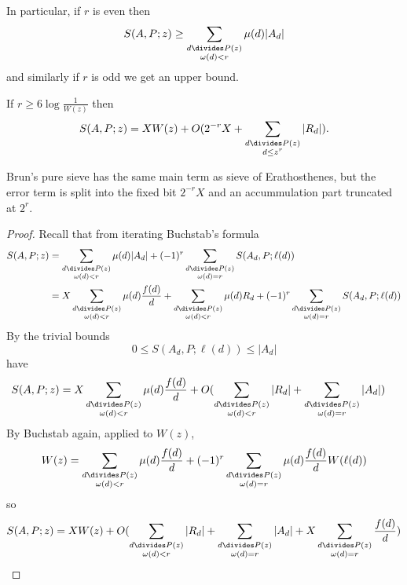 \documentclass[a4paper]{article}
\theoremstyle{definition}
\begin{document}
In particular, if \(r\) is even then
\[
  S(A, P; z) \geq \sum_{\substack{d \divides P(z) \\ \omega(d) < r}} \mu(d) |A_d|
\]
and similarly if \(r\) is odd we get an upper bound.

\begin{theorem}
  If \(r \geq 6 \log \frac{1}{W(z)}\) then
  \[
    S(A, P; z) = XW(z) + O(2^{-r} X + \sum_{\substack{d \divides P(z) \\ d \leq z^r}} |R_d|).
  \]
\end{theorem}

Brun's pure sieve has the same main term as sieve of Erathosthenes, but the error term is split into the fixed bit \(2^{-r}X\) and an accummulation part truncated at \(2^r\).

\begin{proof}
  Recall that from iterating Buchstab's formula
  \begin{align*}
    S(A, P; z)
    &= \sum_{\substack{d \divides P(z) \\ \omega(d) < r}} \mu(d) |A_d| + (-1)^r \sum_{\substack{d \divides P(z) \\ \omega(d) = r}} S(A_d, P; \ell(d)) \\
    &= X \sum_{\substack{d \divides P(z) \\ \omega(d) < r}} \mu(d) \frac{f(d)}{d} + \sum_{\substack{d \divides P(z) \\ \omega(d) < r}} \mu(d) R_d + (-1)^r \sum_{\substack{d \divides P(z) \\ \omega(d) = r}} S(A_d, P; \ell(d))
  \end{align*}
  By the trivial bounds
  \[
    0 \leq S(A_d, P; \ell(d)) \leq |A_d|
  \]
  have
  \begin{align*}
    S(A, P; z)
    &= X \sum_{\substack{d \divides P(z) \\ \omega(d) < r}} \mu(d) \frac{f(d)}{d} + O(\sum_{\substack{d \divides P(z) \\ \omega(d) < r}} |R_d| + \sum_{\substack{d \divides P(z) \\ \omega(d) = r}} |A_d|)
  \end{align*}
  By Buchstab again, applied to \(W(z)\),
  \[
    W(z)
    = \sum_{\substack{d \divides P(z) \\ \omega(d) < r}} \mu(d) \frac{f(d)}{d} + (-1)^r \sum_{\substack{d \divides P(z) \\ \omega(d) = r}} \mu(d) \frac{f(d)}{d} W(\ell(d))
  \]
  so
  \[
    S(A, P; z) = XW(z) + O(\sum_{\substack{d \divides P(z) \\ \omega(d) < r}} |R_d| + \sum_{\substack{d \divides P(z) \\ \omega(d) = r}} |A_d| + X\sum_{\substack{d \divides P(z) \\ \omega(d) = r}} \frac{f(d)}{d})
\]
\end{proof}
\end{document}
